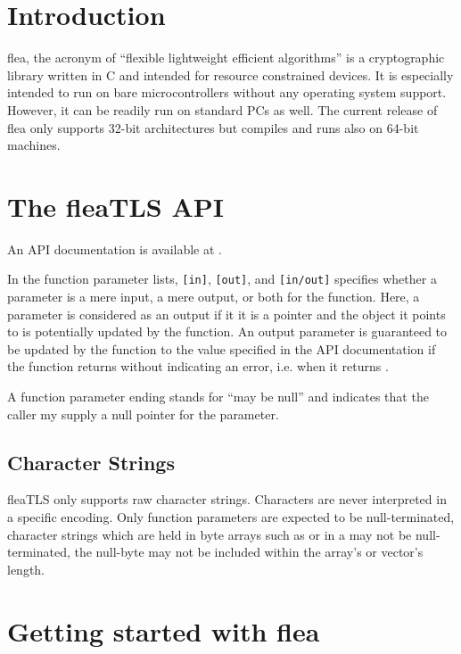 \documentclass[a4paper,11pt]{scrartcl}
\begin{document}
\newpage

\section{Introduction}
flea, the acronym of ``flexible lightweight efficient algorithms'' is a
cryptographic library written in C and intended for resource
constrained devices. 
It is especially intended to run on bare microcontrollers without
any operating system support. However, it can be readily run on standard PCs as
well. The current release of flea only supports 32-bit architectures but
compiles and runs also on 64-bit machines.

 
  \section{The fleaTLS API}
  An API documentation is available at . 

  In the function parameter lists, \verb#[in]#, \verb#[out]#, and
  \verb#[in/out]# specifies whether a parameter is a mere input, a mere output,
  or both for the function. Here, a parameter is considered as an output if it
  it is a pointer and the object it points to is potentially updated by the
  function. An output parameter is guaranteed to be updated by the function to
  the value specified in the API documentation if the function returns without
  indicating an error, i.e. when it returns .

  A function parameter ending  stands for ``may be null'' and
  indicates that the caller my supply a null pointer for the parameter.

  \subsection{Character Strings}

  fleaTLS only supports raw character strings. Characters are never interpreted in 
  a specific encoding. Only  function parameters are expected to be
  null-terminated, character strings which are held in byte arrays such as
   or in a  may not be
  null-terminated, \ie the null-byte may not be included within the array's or
  vector's length.

\section{Getting started with flea}
\end{document}
